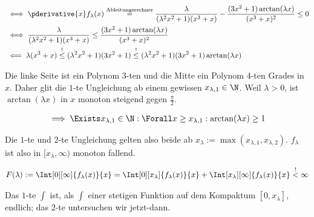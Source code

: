 \begin{solution}
\begin{enumerate}[label = \arabic*.]
    \begin{align*}
        & \iff
        \pderivative{x}
        f_\lambda(x)
        \stackrel
        {
            \mathrm{Ableitungsrechner}
        }{=}
        \frac{\lambda}
        {
            (\lambda^2 x^2 + 1)
            (x^3 + x)
        }
        -
        \frac
        {
            (3 x^2 + 1)
            \arctan(\lambda x)
        }{
            (x^3 + x)^2
        }
        \leq 0 \\
        & \iff
        \frac{\lambda}
        {
            (\lambda^2 x^2 + 1)
            (x^3 + x)
        }
        \leq
        \frac
        {
            (3 x^2 + 1)
            \arctan(\lambda x)
        }{
            (x^3 + x)^2
        } \\
        & \impliedby
        \lambda (x^3 + x)
        \stackrel{!}{\leq}
        (\lambda^2 x^2 + 1) (3 x^2 + 1)
        \stackrel{!}{\leq}
        (\lambda^2 x^2 + 1) (3 x^2 + 1) \arctan(\lambda x) \\
    \end{align*}

    Die linke Seite ist ein Polynom $3$-ten und die Mitte ein Polynom $4$-ten Grades in $x$.
    Daher glit die $1$-te Ungleichung ab einem gewissen $x_{\lambda, 1} \in \N$.
    Weil $\lambda > 0$, ist $\arctan(\lambda x)$ in $x$ monoton steigend gegen $\frac{\pi}{2}$.

    \begin{align*}
        \implies
        \Exists x_{\lambda, 1} \in \N:
        \Forall x \geq x_{\lambda, 1}:
        \arctan(\lambda x) \geq 1
    \end{align*}

    Die $1$-te und $2$-te Ungleichung gelten also beide ab $x_\lambda := \max(x_{\lambda, 1}, x_{\lambda, 2})$.
    $f_\lambda$ ist also in $[x_\lambda, \infty)$ monoton fallend.

    \begin{align*}
        F(\lambda)
        :=
        \Int[0][\infty]
        {
            f_\lambda(x)
        }{x}
        =
        \Int[0][x_\lambda]
        {
            f_\lambda(x)
        }{x}
        +
        \Int[x_\lambda][\infty]
        {
            f_\lambda(x)
        }{x}
        \stackrel{!}{<}
        \infty
    \end{align*}

    Das $1$-te $\int$ ist, als $\int$ einer stetigen Funktion auf dem Kompaktum $[0, x_\lambda]$, endlich;
    das $2$-te untersuchen wir jetzt-dann.


\end{enumerate}
\end{solution}
